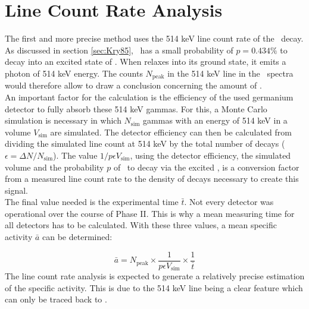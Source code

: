 \documentclass[encoding=utf8,british]{tumphthesis}
\begin{document}
 
\chapter{Line Count Rate Analysis}
\label{sec:SAfrom514}

The first and more precise method uses the 514 keV line count rate of the \Kr\ decay.
As discussed in section \ref{sec:Kry85}, \Kr\ has a small probability of $p=0.434\%$ to decay into an excited state of . 
When  relaxes into its ground state, it emits a photon of 514 keV energy.
The counts $N_{\mathrm{peak}}$ in the 514 keV line in the \gerda\ spectra would therefore allow to draw a conclusion concerning the amount of \Kr. 
\\

An important factor for the calculation is the efficiency of the used germanium detector to fully absorb these 514 keV gammas.
For this, a Monte Carlo simulation is necessary in which $N_{\mathrm{sim}}$ gammas with an energy of 514 keV  in a  volume $V_{\mathrm{sim}}$ are simulated.
The detector efficiency can then be calculated from dividing the simulated line count at 514 keV by the total number of  decays ($\epsilon = \Delta N/N_{\mathrm{sim}}$).
The value $1/p \epsilon V_{\mathrm{sim}}$, using the detector efficiency, the simulated volume and the probability $p$ of \Kr\ to decay via the excited , is a conversion factor from a measured line count rate to the density of decays necessary to create this signal.
\\

The final value needed is the experimental time $\bar{t}$.
Not every detector was operational over the course of Phase II.
This is why a mean measuring time for all detectors has to be calculated.
With these three values, a mean specific activity $\bar{a}$ can be determined:

\begin{equation}
    \bar{a} = N_{\mathrm{peak}}\times\frac{1}{p \epsilon V_{\mathrm{sim}}}\times\frac{1}{\bar{t}}
    \label{equ:activityDieErste}
\end{equation}
The line count rate analysis is expected to generate a relatively precise estimation of the specific activity.
This is due to the 514 keV line being a clear feature which can only be traced back to \Kr.
\\
\end{document}
